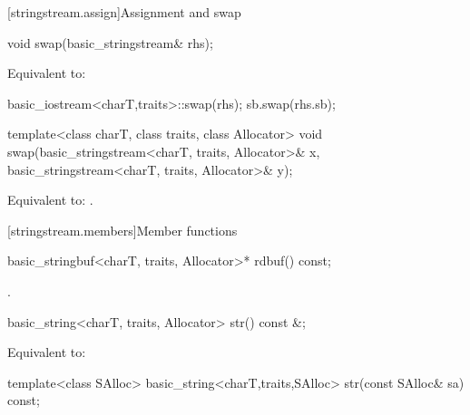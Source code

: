 [stringstream.assign]{Assignment and swap}

%
\begin{itemdecl}
void swap(basic_stringstream& rhs);
\end{itemdecl}

\begin{itemdescr}
\pnum
\effects
Equivalent to:
\begin{codeblock}
basic_iostream<charT,traits>::swap(rhs);
sb.swap(rhs.sb);
\end{codeblock}
\end{itemdescr}

%
\begin{itemdecl}
template<class charT, class traits, class Allocator>
  void swap(basic_stringstream<charT, traits, Allocator>& x,
            basic_stringstream<charT, traits, Allocator>& y);
\end{itemdecl}

\begin{itemdescr}
\pnum
\effects
Equivalent to: .
\end{itemdescr}

[stringstream.members]{Member functions}

%
\begin{itemdecl}
basic_stringbuf<charT, traits, Allocator>* rdbuf() const;
\end{itemdecl}

\begin{itemdescr}
\pnum
\returns
{}.
\end{itemdescr}

%
\begin{itemdecl}
basic_string<charT, traits, Allocator> str() const &;
\end{itemdecl}

\begin{itemdescr}
\pnum
\effects
Equivalent to: 
\end{itemdescr}

%
\begin{itemdecl}
template<class SAlloc>
  basic_string<charT,traits,SAlloc> str(const SAlloc& sa) const;
\end{itemdecl}

